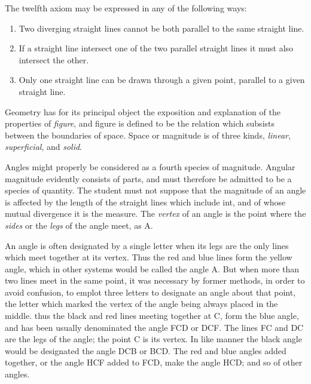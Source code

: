 		The twelfth axiom may be expressed in any of the following ways: 
		\begin{enumerate}[itemsep=0pt]
			\item Two diverging straight lines cannot be both parallel to the same 
                straight line. 
			\item If a straight line intersect one of the two parallel straight 
                lines it must also intersect the other. 
			\item Only one straight line can be drawn through a given point, 
                parallel to a given straight line. 
		\end{enumerate} 

		Geometry has for its principal object the exposition and explanation of 
        the properties of \textit{figure}, and figure is defined to be the 
        relation which subsists between the boundaries of space. Space or 
        magnitude is of three kinds, \textit{linear}, 
        \textit{superficial}, and \textit{solid}. 

		Angles might properly be considered as a fourth species of magnitude. 
        Angular magnitude evidently consists of parts, and must therefore 
        be admitted to be a species of quantity. The student must not 
        suppose that the magnitude of an angle is affected by the length 
        of the straight lines which include int, and of whose mutual 
        divergence it is the measure. The \textit{vertex} of an angle is 
        the point where the \textit{sides} or the \textit{legs} of the 
        angle meet, as A. 

		An angle is often designated by a single letter when its legs are the 
        only lines which meet together at its vertex. Thus the red and 
        blue lines form the yellow angle, which in other systems would be 
        called the angle A. But when more than two lines meet in the same 
        point, it was necessary by former methods, in order to avoid 
        confusion, to emplot three letters to designate an angle about 
        that point, the letter which marked the vertex of the angle being 
        always placed in the middle. thus the black and red lines meeting 
        together at C, form the blue angle, and has been usually 
        denominated the angle FCD or DCF. The lines FC and DC are the legs 
        of the angle; the point C is its vertex. In like manner the black 
        angle would be designated the angle DCB or BCD. The red and blue 
        angles added together, or the angle HCF added to FCD, make the 
        angle HCD; and so of other angles. 

